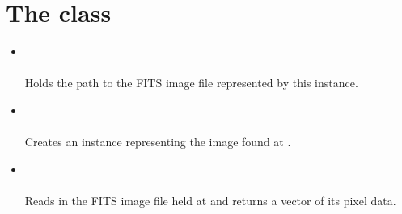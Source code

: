 \section*{The   class}
\begin{itemize}
\item {}\\\\
Holds the path to the FITS image file represented by this instance.
\item {}\\\\
Creates an  instance representing the image found at .
\item {}\\\\
Reads in the FITS image file held at  and returns a vector of its pixel data.
\end{itemize}

